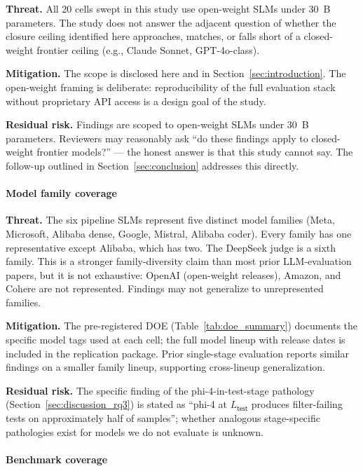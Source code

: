 \textbf{Threat.} All 20 cells swept in this study use open-weight SLMs under 30~B parameters. The study does not answer the adjacent question of whether the closure ceiling identified here approaches, matches, or falls short of a closed-weight frontier ceiling (e.g., Claude Sonnet, GPT-4o-class).

\textbf{Mitigation.} The scope is disclosed here and in Section~\ref{sec:introduction}. The open-weight framing is deliberate: reproducibility of the full evaluation stack without proprietary API access is a design goal of the study.

\textbf{Residual risk.} Findings are scoped to open-weight SLMs under 30~B parameters. Reviewers may reasonably ask ``do these findings apply to closed-weight frontier models?'' --- the honest answer is that this study cannot say. The follow-up outlined in Section~\ref{sec:conclusion} addresses this directly.

\paragraph{Model family coverage}

\textbf{Threat.} The six pipeline SLMs represent five distinct model families (Meta, Microsoft, Alibaba dense, Google, Mistral, Alibaba coder). Every family has one representative except Alibaba, which has two. The DeepSeek judge is a sixth family. This is a stronger family-diversity claim than most prior LLM-evaluation papers, but it is not exhaustive: OpenAI (open-weight releases), Amazon, and Cohere are not represented. Findings may not generalize to unrepresented families.

\textbf{Mitigation.} The pre-registered DOE (Table~\ref{tab:doe_summary}) documents the specific model tags used at each cell; the full model lineup with release dates is included in the replication package. Prior single-stage evaluation reports similar findings on a smaller family lineup, supporting cross-lineup generalization.

\textbf{Residual risk.} The specific finding of the phi-4-in-test-stage pathology (Section~\ref{sec:discussion_rq3}) is stated as ``phi-4 at $L_{\textsf{test}}$ produces filter-failing tests on approximately half of samples''; whether analogous stage-specific pathologies exist for models we do not evaluate is unknown.

\paragraph{Benchmark coverage}

